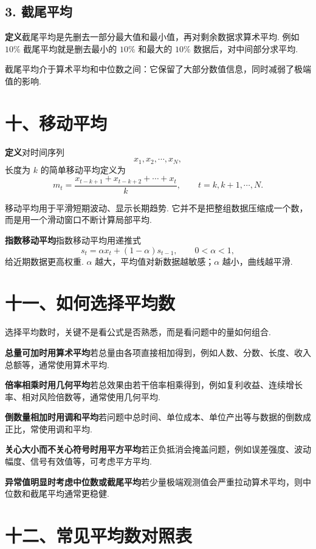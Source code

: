 \documentclass[UTF8, 12pt, fontset=fandol, oneside]{ctexart}
\begin{document}
\subsection*{3. 截尾平均}

\noindent\textbf{定义}\quad 截尾平均是先删去一部分最大值和最小值，再对剩余数据求算术平均. 例如 $10\%$ 截尾平均就是删去最小的 $10\%$ 和最大的 $10\%$ 数据后，对中间部分求平均.

截尾平均介于算术平均和中位数之间：它保留了大部分数值信息，同时减弱了极端值的影响.

\section*{十、移动平均}

\noindent\textbf{定义}\quad 对时间序列
\[
  x_1,x_2,\cdots,x_N,
\]
长度为 $k$ 的简单移动平均定义为
\[
  m_t=\frac{x_{t-k+1}+x_{t-k+2}+\cdots+x_t}{k},
  \qquad t=k,k+1,\cdots,N.
\]

移动平均用于平滑短期波动、显示长期趋势. 它并不是把整组数据压缩成一个数，而是用一个滑动窗口不断计算局部平均.

\noindent\textbf{指数移动平均}\quad 指数移动平均用递推式
\[
  s_t=\alpha x_t+(1-\alpha)s_{t-1},\qquad 0<\alpha<1,
\]
给近期数据更高权重. $\alpha$ 越大，平均值对新数据越敏感；$\alpha$ 越小，曲线越平滑.

\section*{十一、如何选择平均数}

选择平均数时，关键不是看公式是否熟悉，而是看问题中的量如何组合.

\noindent\textbf{总量可加时用算术平均}\quad 若总量由各项直接相加得到，例如人数、分数、长度、收入总额等，通常使用算术平均.

\noindent\textbf{倍率相乘时用几何平均}\quad 若总效果由若干倍率相乘得到，例如复利收益、连续增长率、相对风险倍数等，通常使用几何平均.

\noindent\textbf{倒数量相加时用调和平均}\quad 若问题中总时间、单位成本、单位产出等与数据的倒数成正比，常使用调和平均.

\noindent\textbf{关心大小而不关心符号时用平方平均}\quad 若正负抵消会掩盖问题，例如误差强度、波动幅度、信号有效值等，可考虑平方平均.

\noindent\textbf{异常值明显时考虑中位数或截尾平均}\quad 若少量极端观测值会严重拉动算术平均，则中位数和截尾平均通常更稳健.

\section*{十二、常见平均数对照表}
\end{document}
